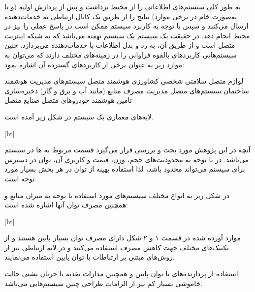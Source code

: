 
\label{فصل۲:مفاهیم اولیه}

به طور کلی سیستم‌های  اطلاعاتی را از محیط برداشت و پس از پردازش اولیه (و یا به‌صورت خام در برخی موارد) نتایج را از طریق یک کانال ارتباطی به خدمات‌دهنده ارسال می‌کنند و سپس با توجه به کاربرد سیستم ممکن است در پاسخ عملی را نیز در محیط انجام دهد. در حقیقت یک سیستم  یک سیستم نهفته می‌باشد که به شبکه اینترنت متصل است و از طریق آن، به رد و بدل اطلاعات با خدمات‌دهنده می‌پردازد. چنین سیستم‌هایی کاربردهای بالقوه فراوانی را در زمینه‌های مختلف دارند که می‌توان به موارد زیر به عنوان برخی از کاربردهای گسترده آن اشاره نمود:


 لوازم متصل سلامتی شخصی
 کشاورزی هوشمند متصل
 سیستم‌های مدیریت هوشمند ساختمان
 سیستم‌های متصل مدیریت مصرف منابع (مانند آب و برق و گاز)
 ذخیره‌سازی تامین هوشمند
 خودروهای متصل
 صنایع متصل


لایه‌های معماری یک سیستم  در شکل زیر آمده است.

[ht]



آنچه در این پژوهش مورد بحث و بررسی قرار می‌گیرد قسمت مربوط به  ها در سیستم  می‌باشد. در  با توجه به محدودیت‌های حجم، وزن، قیمت و کاربری آن، توان در دسترس برای سیستم می‌تواند محدود باشد، لذا استفاده بهینه از توان در هر بخش بسیار مورد توجه است. 


در شکل زیر به انواع مختلف سیستم‌های  مورد استفاده با توجه به میزان منابع و همچنین مصرف توان آنها اشاره شده است:
	
[ht]


موارد آورده شده در قسمت ۱ و ۲ شکل دارای مصرف توان بسیار پایین هستند و از تکنیک‌های مختلف جهت کاهش مصرف استفاده می‌کنند و در لایه ارتباطی نیز از روش‌های مبتنی بر ارتباطات با توان پایین استفاده می‌نمایند. 

استفاده از پردازنده‌های با توان پایین و همچنین مدارات تغذیه با جریان نشتی حالت خاموشی بسیار کم نیز از الزامات طراحی چنین سیستم‌هایی می‌باشد. 


